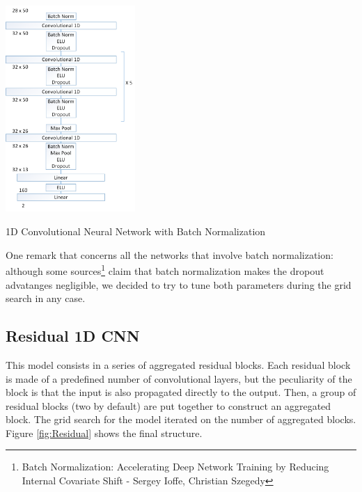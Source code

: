 \documentclass[10pt,conference,compsocconf]{IEEEtran}
\begin{document}
\begin{center}
	\captionsetup{type=figure}
	\includegraphics[width=0.37\textwidth]{img/Conv1DBatchNorm.png}
	\caption {1D Convolutional Neural Network with Batch Normalization}
	\label{fig:Conv1D}
\end{center}

One remark that concerns all the networks that involve batch normalization: although some sources\footnote{Batch Normalization: Accelerating Deep Network Training by Reducing Internal Covariate Shift - Sergey Ioffe, Christian Szegedy} claim that batch normalization makes the dropout advatanges negligible, we decided to try to tune both parameters during the grid search in any case.


\subsection{Residual 1D CNN}
This model consists in a series of aggregated residual blocks. Each residual block is made of a predefined number of convolutional layers, but the peculiarity of the block is that the input is also propagated directly to the output. Then, a group of residual blocks (two by default) are put together to construct an aggregated block. The grid search for the model iterated on the number of aggregated blocks. Figure \ref{fig:Residual} shows the final structure.

\end{document}
